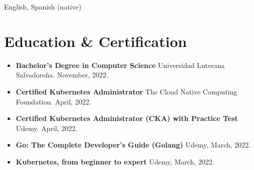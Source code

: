 \documentclass[letterpaper]{article}
\begin{document}
English, Spanish (native)

\section{Education \& Certification}

\begin{itemize}
	\item \textbf{Bachelor's Degree in Computer Science} \newline Universidad Luterana Salvadoreña. November, 2022.

	\item \textbf{Certified Kubernetes Administrator} \newline The Cloud Native Computing Foundation. April, 2022.

  \item \textbf{Certified Kubernetes Administrator (CKA) with Practice Test} \newline Udemy. April, 2022.

  \item \textbf{Go: The Complete Developer's Guide (Golang)} \newline Udemy, March, 2022.

  \item \textbf{Kubernetes, from beginner to expert} \newline Udemy, March, 2022.
\end{itemize}
\end{document}
